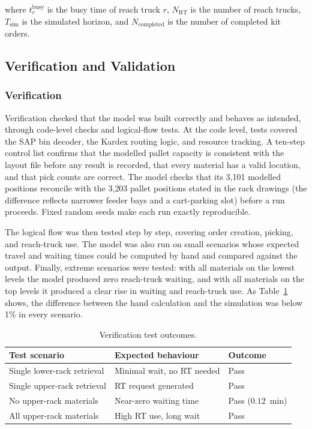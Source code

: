 \documentclass[conference]{IEEEtran}
\begin{document}
\noindent where $t^{\mathrm{busy}}_r$ is the busy time of reach truck $r$,
$N_{\mathrm{RT}}$ is the number of reach trucks, $T_{\mathrm{sim}}$ is the
simulated horizon, and $N_{\mathrm{completed}}$ is the number of completed kit
orders.

\subsection{Verification and Validation}
\subsubsection{Verification}
Verification checked that the model was built correctly and behaves as
intended, through code-level checks and logical-flow tests. At the code level,
tests covered the SAP bin decoder, the Kardex routing logic, and resource
tracking. A ten-step control list confirms that the modelled pallet capacity
is consistent with the layout file before any result is recorded, that every
material has a valid location, and that pick counts are correct. The model
checks that its 3{,}101 modelled positions reconcile with the 3{,}203 pallet
positions stated in the rack drawings (the difference reflects narrower feeder
bays and a cart-parking slot) before a run proceeds. Fixed random seeds make
each run exactly reproducible.

The logical flow was then tested step by step, covering order creation,
picking, and reach-truck use. The model was also run on small scenarios whose
expected travel and waiting times could be computed by hand and compared
against the output. Finally, extreme scenarios were tested: with all materials
on the lowest levels the model produced zero reach-truck waiting, and with all
materials on the top levels it produced a clear rise in waiting and reach-truck
use. As Table~\ref{tab:verify} shows, the difference between the hand
calculation and the simulation was below 1\% in every scenario.

\begin{table}[htbp]
\centering
\caption{Verification test outcomes.}
\label{tab:verify}
\begin{tabular}{lll}
\toprule
Test scenario & Expected behaviour & Outcome \\
\midrule
Single lower-rack retrieval & Minimal wait, no RT needed & Pass \\
Single upper-rack retrieval & RT request generated & Pass \\
No upper-rack materials & Near-zero waiting time & Pass ($0.12$~min) \\
All upper-rack materials & High RT use, long wait & Pass \\
\bottomrule
\end{tabular}
\end{table}
\end{document}
